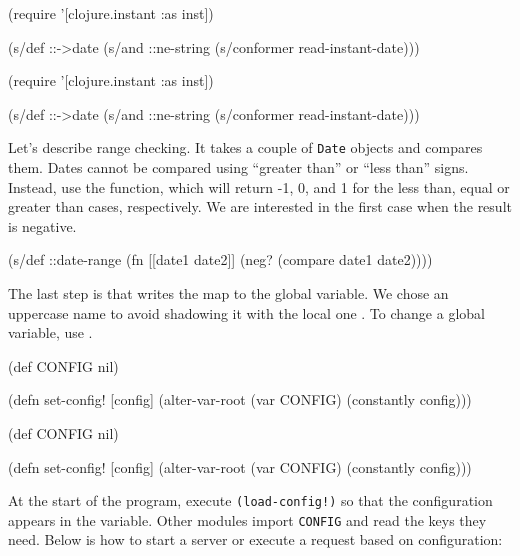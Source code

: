 \ifnarrow

\begin{clojure}
(require '[clojure.instant :as inst])

(s/def ::->date
  (s/and ::ne-string
    (s/conformer read-instant-date)))
\end{clojure}

\else

\begin{clojure}
(require '[clojure.instant :as inst])

(s/def ::->date
  (s/and ::ne-string (s/conformer read-instant-date)))
\end{clojure}

\fi


Let's describe range checking. It takes a couple of \verb|Date| objects and compares them. Dates cannot be compared using ``greater than'' or ``less than'' signs. Instead, use the  function, which will return -1, 0, and 1 for the less than, equal or greater than cases, respectively. We are interested in the first case when the result is negative.

\begin{clojure}
(s/def ::date-range
  (fn [[date1 date2]]
    (neg? (compare date1 date2))))
\end{clojure}

The last step is  that writes the map to the global  variable. We chose an uppercase name to avoid shadowing it with the local one . To change a global variable, use .


\ifnarrow

\begin{clojure}
(def CONFIG nil)

(defn set-config!
  [config]
  (alter-var-root (var CONFIG)
    (constantly config)))
\end{clojure}

\else

\begin{clojure}
(def CONFIG nil)

(defn set-config!
  [config]
  (alter-var-root (var CONFIG) (constantly config)))
\end{clojure}

\fi

At the start of the program, execute \texttt{(load-config!)} so that the configuration appears in the variable. Other modules import \verb|CONFIG| and read the keys they need. Below is how to start a server or execute a request based on configuration:

